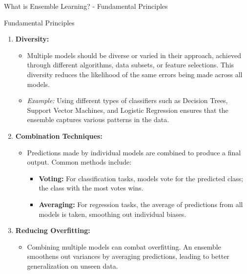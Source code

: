 \documentclass[aspectratio=169]{beamer}
\begin{document}
\begin{frame}[fragile]{What is Ensemble Learning? - Fundamental Principles}
    \begin{block}{Fundamental Principles}
        \begin{enumerate}
            \item \textbf{Diversity:} 
                \begin{itemize}
                    \item Multiple models should be diverse or varied in their approach, achieved through different algorithms, data subsets, or feature selections. This diversity reduces the likelihood of the same errors being made across all models.
                    \item \textit{Example:} Using different types of classifiers such as Decision Trees, Support Vector Machines, and Logistic Regression ensures that the ensemble captures various patterns in the data.
                \end{itemize}
            \item \textbf{Combination Techniques:} 
                \begin{itemize}
                    \item Predictions made by individual models are combined to produce a final output. Common methods include:
                        \begin{itemize}
                            \item \textbf{Voting:} For classification tasks, models vote for the predicted class; the class with the most votes wins.
                            \item \textbf{Averaging:} For regression tasks, the average of predictions from all models is taken, smoothing out individual biases.
                        \end{itemize}
                \end{itemize}
            \item \textbf{Reducing Overfitting:} 
                \begin{itemize}
                    \item Combining multiple models can combat overfitting. An ensemble smoothens out variances by averaging predictions, leading to better generalization on unseen data.
                \end{itemize}
        \end{enumerate}
    \end{block}
\end{frame}
\end{document}
